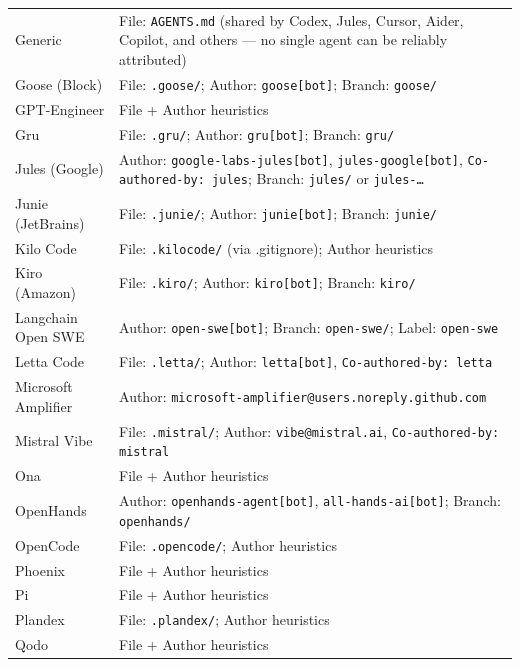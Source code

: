 \documentclass[10pt,a4paper]{article}
\begin{document}
\begin{longtable}{L{3cm}L{10.5cm}}
Generic          & File: \texttt{AGENTS.md} (shared by Codex, Jules, Cursor, Aider, Copilot, and others — no single agent can be reliably attributed) \\
Goose (Block)    & File: \texttt{.goose/}; Author: \texttt{goose[bot]}; Branch: \texttt{goose/} \\
GPT-Engineer     & File + Author heuristics \\
Gru              & File: \texttt{.gru/}; Author: \texttt{gru[bot]}; Branch: \texttt{gru/} \\
Jules (Google)   & Author: \texttt{google-labs-jules[bot]}, \texttt{jules-google[bot]}, \texttt{Co-authored-by: jules}; Branch: \texttt{jules/} or \texttt{jules-\ldots} \\
Junie (JetBrains)& File: \texttt{.junie/}; Author: \texttt{junie[bot]}; Branch: \texttt{junie/} \\
Kilo Code        & File: \texttt{.kilocode/} (via .gitignore); Author heuristics \\
Kiro (Amazon)    & File: \texttt{.kiro/}; Author: \texttt{kiro[bot]}; Branch: \texttt{kiro/} \\
Langchain Open SWE & Author: \texttt{open-swe[bot]}; Branch: \texttt{open-swe/}; Label: \texttt{open-swe} \\
Letta Code       & File: \texttt{.letta/}; Author: \texttt{letta[bot]}, \texttt{Co-authored-by: letta} \\
Microsoft Amplifier & Author: \texttt{microsoft-amplifier@users.noreply.github.com} \\
Mistral Vibe     & File: \texttt{.mistral/}; Author: \texttt{vibe@mistral.ai}, \texttt{Co-authored-by: mistral} \\
Ona              & File + Author heuristics \\
OpenHands        & Author: \texttt{openhands-agent[bot]}, \texttt{all-hands-ai[bot]}; Branch: \texttt{openhands/} \\
OpenCode         & File: \texttt{.opencode/}; Author heuristics \\
Phoenix          & File + Author heuristics \\
Pi               & File + Author heuristics \\
Plandex          & File: \texttt{.plandex/}; Author heuristics \\
Qodo             & File + Author heuristics \\

\end{longtable}
\end{document}
